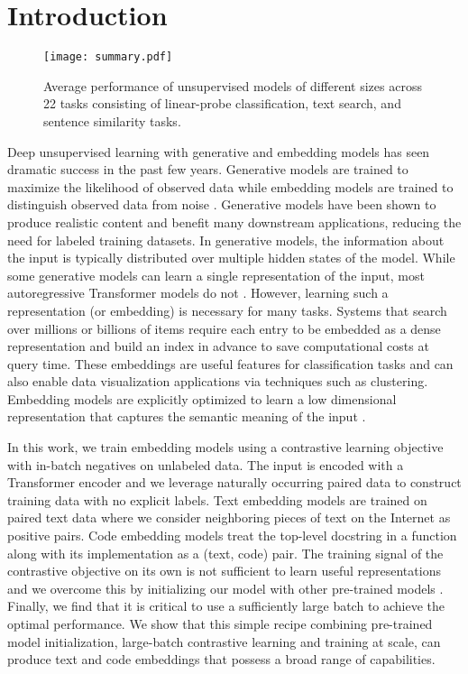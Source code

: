 \documentclass[nohyperref]{article}
\begin{document}
\section{Introduction}
\begin{figure}[h]
\centering
\texttt{[image: summary.pdf]}
\caption{Average performance of unsupervised  models of different sizes across 22 tasks consisting of linear-probe classification, text search, and sentence similarity tasks.}
\label{fig:summary}
\end{figure}
Deep unsupervised learning with generative and embedding models has seen dramatic success in the past few years. Generative models \cite{elmo, t5, wavenet, dalle, gpt-3, codex} are trained to maximize the likelihood of observed data while embedding models are trained to distinguish observed data from noise \cite{inbatch,Oord,clip,align,simcse,contreiver}.  Generative models have been shown to produce realistic content and benefit many downstream applications, reducing the need for labeled training datasets. In generative models, the information about the input is typically distributed over multiple hidden states of the model. While some generative models \cite{vae,Kiros} can learn a single representation of the input, most autoregressive Transformer \cite{transformer} models do not \cite{t5, gpt-3, codex, dalle}. However, learning such a representation (or embedding) is necessary for many tasks. Systems that search over millions or billions of items require each entry to be embedded as a dense representation and build an index in advance to save computational costs at query time. These embeddings are useful features for classification tasks and can also enable data visualization applications via techniques such as clustering. Embedding models are explicitly optimized to learn a low dimensional representation that captures the semantic meaning of the input \cite{clip,align,declutr,simcse,contreiver}.   

In this work, we train embedding models using a contrastive learning objective with in-batch negatives \cite{inbatch,contrastive} on unlabeled data. The input is encoded with a Transformer encoder \cite{transformer} and we leverage naturally occurring paired data to construct training data with no explicit labels. Text embedding models are trained on paired text data where we consider neighboring pieces of text on the Internet as positive pairs. Code embedding models treat the top-level docstring in a function along with its implementation as a (text, code) pair. The training signal of the contrastive objective on its own is not sufficient to learn useful representations and we overcome this by initializing our model with other pre-trained models \cite{gpt-3,codex}. Finally, we find that it is critical to use a sufficiently large batch to achieve the optimal performance. We show that this simple recipe combining pre-trained model initialization, large-batch contrastive learning and training at scale, can produce text and code embeddings that possess a broad range of capabilities.
\end{document}
